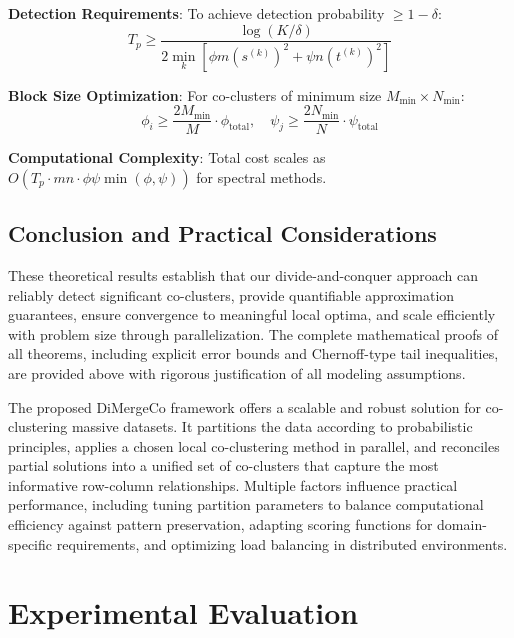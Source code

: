\documentclass[journal]{IEEEtran}
\begin{document}
\textbf{Detection Requirements}: To achieve detection probability $\geq 1-\delta$:
\begin{equation}
    T_p \geq \frac{\log(K/\delta)}{2 \min_k [\phi m (s^{(k)})^2 + \psi n (t^{(k)})^2]}
\end{equation}

\textbf{Block Size Optimization}: For co-clusters of minimum size $M_{\min} \times N_{\min}$:
$$\phi_i \geq \frac{2M_{\min}}{M} \cdot \phi_{\text{total}}, \quad \psi_j \geq \frac{2N_{\min}}{N} \cdot \psi_{\text{total}}$$

\textbf{Computational Complexity}: Total cost scales as $O(T_p \cdot mn \cdot \phi \psi \min(\phi, \psi))$ for spectral methods.

\subsection{Conclusion and Practical Considerations}

These theoretical results establish that our divide-and-conquer approach can reliably detect significant co-clusters, provide quantifiable approximation guarantees, ensure convergence to meaningful local optima, and scale efficiently with problem size through parallelization. The complete mathematical proofs of all theorems, including explicit error bounds and Chernoff-type tail inequalities, are provided above with rigorous justification of all modeling assumptions.

The proposed DiMergeCo framework offers a scalable and robust solution for co-clustering massive datasets. It partitions the data according to probabilistic principles, applies a chosen local co-clustering method in parallel, and reconciles partial solutions into a unified set of co-clusters that capture the most informative row-column relationships. Multiple factors influence practical performance, including tuning partition parameters to balance computational efficiency against pattern preservation, adapting scoring functions for domain-specific requirements, and optimizing load balancing in distributed environments.

\section{Experimental Evaluation}
\label{sec:experiment}
\end{document}
